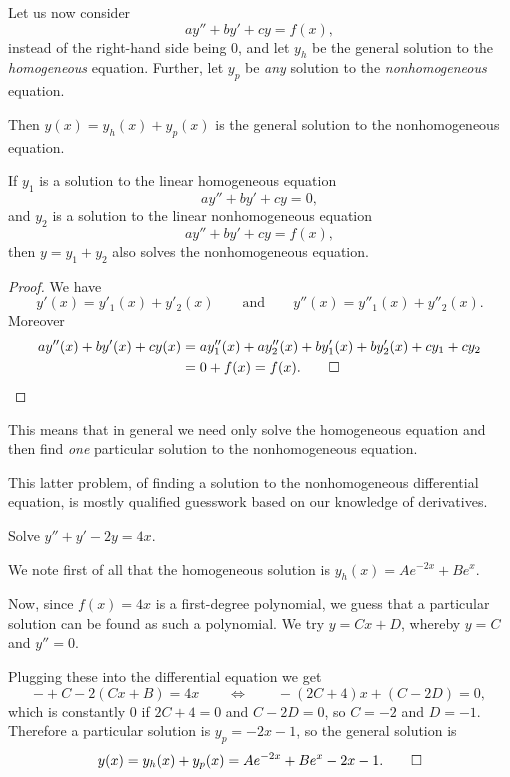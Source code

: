 

Let us now consider
\[
	a y'' + b y' + c y = f(x),
\]
instead of the right-hand side being 0, and let $y_h$ be the general solution to the \emph{homogeneous} equation.
Further, let $y_p$ be \emph{any} solution to the \emph{nonhomogeneous} equation.

Then $y(x) = y_h(x) + y_p(x)$ is the general solution to the nonhomogeneous equation.

\begin{theorem}
	If $y_1$ is a solution to the linear homogeneous equation
	\[
		a y'' + b y' + c y = 0,
	\]
	and $y_2$ is a solution to the linear nonhomogeneous equation
	\[
		a y'' + b y' + c y = f(x),
	\]
	then $y = y_1 + y_2$ also solves the nonhomogeneous equation.
\end{theorem}

\begin{proof}
	We have
	\[
		y'(x) = y'_1(x) + y'_2(x) \qquad \text{and} \qquad y''(x) = y''_1(x) + y''_2(x).
	\]
	Moreover
	\begin{align*}
		a y''(x) + b y'(x) + c y(x) &= a y''_1(x) + a y''_2(x) + b y'_1(x) + b y'_2(x) + c y_1 + c y_2 \\
		&= 0 + f(x) = f(x). \qedhere
	\end{align*}
\end{proof}

\noindent
This means that in general we need only solve the homogeneous equation and then find \emph{one} particular solution to the nonhomogeneous equation.

This latter problem, of finding a solution to the nonhomogeneous differential equation, is mostly qualified guesswork based on our knowledge of derivatives.

\begin{example}
	Solve $y'' + y' - 2 y = 4 x$.

	We note first of all that the homogeneous solution is $y_h(x) = A e^{-2 x} + B e^{x}$.

	Now, since $f(x) = 4 x$ is a first-degree polynomial, we guess that a particular solution can be found as such a polynomial.
	We try $y = C x + D$, whereby $y = C$ and $y'' = 0$.

	Plugging these into the differential equation we get
	\[
		- + C - 2(C x + B) = 4 x \qquad \Longleftrightarrow \qquad - (2 C + 4) x + (C - 2 D) = 0,
	\]
	which is constantly 0 if $2 C + 4 = 0$ and $C - 2 D = 0$, so $C = -2$ and $D = -1$.
	Therefore a particular solution is $y_p = - 2 x - 1$, so the general solution is
	\[
		y(x) = y_h(x) + y_p(x) = A e^{-2 x} + B e^{x} - 2 x - 1. \qedhere
	\]
\end{example}

